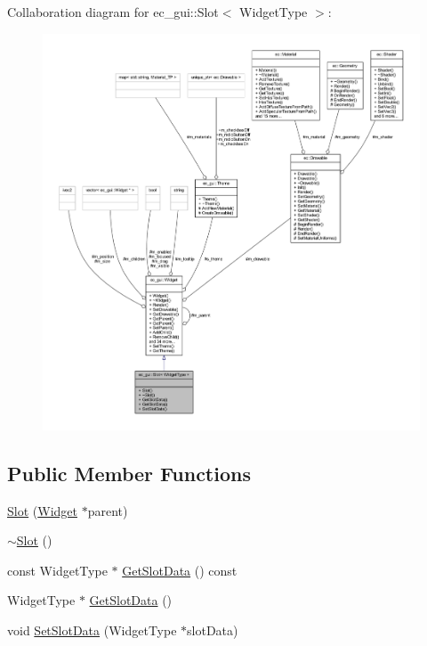 Collaboration diagram for ec\+\_\+gui\+:\+:Slot$<$ Widget\+Type $>$\+:
\nopagebreak
\begin{figure}[H]
\begin{center}
\leavevmode
\includegraphics[width=350pt]{classec__gui_1_1_slot__coll__graph}
\end{center}
\end{figure}
\subsection*{Public Member Functions}
\begin{DoxyCompactItemize}
\item 
\mbox{\hyperlink{classec__gui_1_1_slot_a52d05e762113bda0831abaa8a6ae4f61}{Slot}} (\mbox{\hyperlink{classec__gui_1_1_widget}{Widget}} $\ast$parent)
\item 
\mbox{\hyperlink{classec__gui_1_1_slot_ae1731e73159b5b0564bdb69786b538ce}{$\sim$\+Slot}} ()
\item 
const Widget\+Type $\ast$ \mbox{\hyperlink{classec__gui_1_1_slot_a9fe979317f793129e1f1a25e7aa554d1}{Get\+Slot\+Data}} () const
\item 
Widget\+Type $\ast$ \mbox{\hyperlink{classec__gui_1_1_slot_a4f095102292e99216422f32248d9189f}{Get\+Slot\+Data}} ()
\item 
void \mbox{\hyperlink{classec__gui_1_1_slot_a1c250069c2168720fdbf581e12643bc4}{Set\+Slot\+Data}} (Widget\+Type $\ast$slot\+Data)
\end{DoxyCompactItemize}
